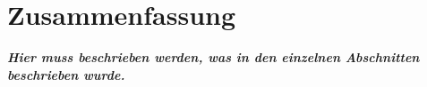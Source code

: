 \chapter{Zusammenfassung} \label{sec:Zusamenfassung}





\textbf{\emph{Hier muss beschrieben werden, was in den einzelnen Abschnitten beschrieben wurde.}}